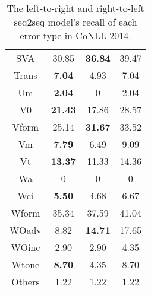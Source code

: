 \documentclass{article} \usepackage{MSRA_TR,times}
\begin{document}
\begin{table}[t]
\begin{tabular}{c|c|c|c}
SVA                 & 30.85                  & \textbf{36.84}         & 39.47                                                          \\
Trans               & \textbf{7.04}          & 4.93                   & 7.04                                                           \\
Um                  & \textbf{2.04}          & 0                      & 2.04                                                           \\
V0                  & \textbf{21.43}         & 17.86                  & 28.57                                                          \\
Vform               & 25.14                  & \textbf{31.67}         & 33.52                                                          \\
Vm                  & \textbf{7.79}          & 6.49                   & 9.09                                                           \\
Vt                  & \textbf{13.37}         & 11.33                  & 14.36                                                          \\
Wa                  & 0                      & 0                      & 0                                                              \\
Wci                 & \textbf{5.50}          & 4.68                   & 6.67                                                           \\
Wform               & 35.34                  & 37.59                  & 41.04                                                          \\
WOadv               & 8.82                   & \textbf{14.71}         & 17.65                                                          \\
WOinc               & 2.90                   & 2.90                   & 4.35                                                           \\
Wtone               & \textbf{8.70}          & 4.35                   & 8.70                                                           \\
Others              & 1.22                   & 1.22                   & 1.22                                                          \\ \hline
\end{tabular}
\caption{The left-to-right and right-to-left seq2seq model's recall of each error type in CoNLL-2014.}\vspace{-0.1cm}
\label{tab:errortype}
\end{table}
\end{document}

